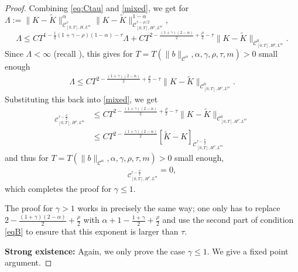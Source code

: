 \documentclass[11pt,a4paper]{article}
\newcommand{\C}{\mathcal{C}}
\newcommand{\cC}{\mathcal{C}}
\newcommand{\wt}{\widetilde}
\renewcommand{\le}{\leqslant}
\numberwithin{equation}{section}
\let\cref\crtcref
\theoremstyle{definition}
\theoremstyle{remark}
\theoremstyle{plain}
\begin{document}
\begin{proof}
Combining \eqref{eq:Ctau} and \eqref{mixed}, we get for $\Lambda:=\|K-\wt{K}\|_{\cC^\tau_{[0,T],H,L^m}}^{\alpha}\|K-\wt{K}\|_{\cC^{\tau-\rho/2}_{[0,T],H^\rho,L^m}}^{1-\alpha}$,
$$
\Lambda\le  C T^{1-\frac12 (1+\gamma-\rho)(1-\alpha)-\tau}\Lambda+C  T^{2-\frac{(1+\gamma)(2-\alpha)}{2}+\frac\rho2-\tau}  \|K-\wt{K}\|_{\cC^0_{[0,T],H^\rho,L^m}}.
$$
Since $\Lambda<\infty$ (recall \cref{r:goodbound}), this gives for $T=T(\|b\|_{\C^\alpha},\alpha,\gamma,\rho,\tau,m)>0$ small enough 
\begin{align}\label{prevnorm}
\Lambda\le C T^{2-\frac{(1+\gamma)(2-\alpha)}{2}+\frac\rho2-\tau}  \|K-\wt{K}\|_{\cC^0_{[0,T],H^\rho,L^m}}.
\end{align}
Substituting this back into \eqref{mixed}, we get 
\begin{align*} 
[\wt{K}-K]_{\mathcal{C}^{\tau-\frac\rho2}_{[0,T],H^\rho,L^m}}&\le C  T^{2-\frac{(1+\gamma)(2-\alpha)}{2}+\frac\rho2-\tau}  \|K-\wt{K}\|_{\cC^0_{[0,T],H^\rho,L^m}}\\
&\leqslant C T^{2-\frac{(1+\gamma)(2-\alpha)}{2}}[\wt{K}-K]_{\mathcal{C}^{\tau-\frac\rho2}_{[0,T],H^\rho,L^m}}
\end{align*}
and thus for $T=T(\|b\|_{\C^\alpha},\alpha,\gamma,\rho,\tau,m)>0$ small enough, 
\begin{align*} 
[\wt{K}-K]_{\mathcal{C}^{\tau-\frac\rho2}_{[0,T],H^\rho,L^m}}=0,
\end{align*}
which completes the proof for $\gamma \leqslant 1$.

The proof for $\gamma>1$ works in precisely the same way; one only has to replace $2-\frac{(1+\gamma)(2-\alpha)}{2}+\frac{\rho}{2}$ with $\alpha+1-\frac{1+\gamma}{2}+\frac{\rho}{2}$ and use the second part of condition \eqref{eqB} to ensure that this exponent is larger than $\tau$.

\textbf{Strong existence:} Again, we only prove the case $\gamma\leqslant 1$. We give a fixed point argument.


\end{proof}
\end{document}
